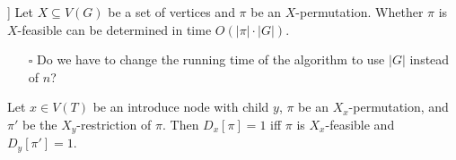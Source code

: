 \documentclass[fontsize=11pt,paper=a4]{book}
\begin{document}
\begin{lem}[[cite:@amiri2016congestionfree; Lemma 4.3]]
Let \(X\subseteq V(G)\) be a set of vertices and \(\pi\) be an \(X\)-permutation.
Whether \(\pi\) is \(X\)-feasible can be determined in time \(O(\lvert\pi\rvert\cdot\lvert G\rvert)\).
\label{org8df618c}
\end{lem}

\begin{itemize}
\item[{$\square$}] Do we have to change the running time of the algorithm to use \(\lvert G\rvert\) instead of \(n\)?
\end{itemize}

\begin{lem}
Let \(x\in V(T)\) be an introduce node with child \(y\), \(\pi\) be an \(X_x\)-permutation, and \(\pi'\) be the \(X_y\)-restriction of \(\pi\).
Then \(D_x[\pi]=1\) iff \(\pi\) is \(X_x\)-feasible and \(D_y[\pi']=1\).
\label{org383b9a9}
\end{lem}
\end{document}
